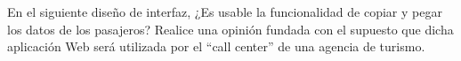 En el siguiente diseño de interfaz, ¿Es usable la funcionalidad de copiar y pegar los datos de los pasajeros? Realice una opinión fundada con el supuesto que dicha aplicación Web será utilizada por el “call center” de una agencia de turismo.
